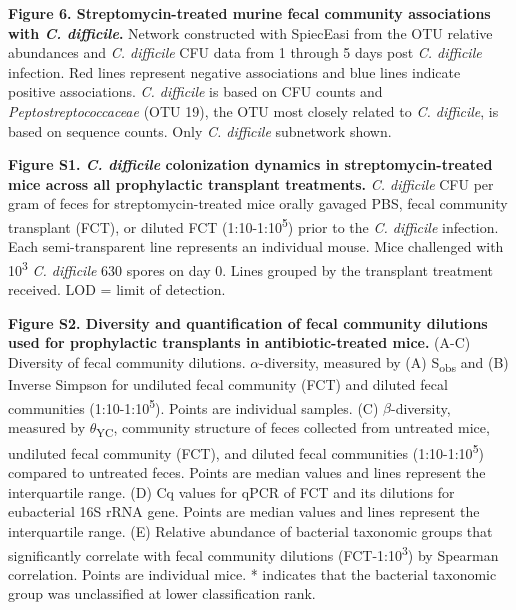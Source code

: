 \documentclass[
  12pt,
]{article}
\begin{document}
\hfill\break

\textbf{Figure 6. Streptomycin-treated murine fecal community
associations with \emph{C. difficile}.} Network constructed with
SpiecEasi from the OTU relative abundances and \emph{C. difficile} CFU
data from 1 through 5 days post \emph{C. difficile} infection. Red lines
represent negative associations and blue lines indicate positive
associations. \emph{C. difficile} is based on CFU counts and
\emph{Peptostreptococcaceae} (OTU 19), the OTU most closely related to
\emph{C. difficile}, is based on sequence counts. Only \emph{C.
difficile} subnetwork shown.

\hfill\break

\textbf{Figure S1. \emph{C. difficile} colonization dynamics in
streptomycin-treated mice across all prophylactic transplant
treatments.} \emph{C. difficile} CFU per gram of feces for
streptomycin-treated mice orally gavaged PBS, fecal community transplant
(FCT), or diluted FCT (1:10-1:10\textsuperscript{5}) prior to the
\emph{C. difficile} infection. Each semi-transparent line represents an
individual mouse. Mice challenged with 10\textsuperscript{3} \emph{C.
difficile} 630 spores on day 0. Lines grouped by the transplant
treatment received. LOD = limit of detection.

\hfill\break

\textbf{Figure S2. Diversity and quantification of fecal community
dilutions used for prophylactic transplants in antibiotic-treated mice.}
(A-C) Diversity of fecal community dilutions. \(\alpha\)-diversity,
measured by (A) S\textsubscript{obs} and (B) Inverse Simpson for
undiluted fecal community (FCT) and diluted fecal communities
(1:10-1:10\textsuperscript{5}). Points are individual samples. (C)
\(\beta\)-diversity, measured by \(\theta\)\textsubscript{YC}, community
structure of feces collected from untreated mice, undiluted fecal
community (FCT), and diluted fecal communities
(1:10-1:10\textsuperscript{5}) compared to untreated feces. Points are
median values and lines represent the interquartile range. (D) Cq values
for qPCR of FCT and its dilutions for eubacterial 16S rRNA gene. Points
are median values and lines represent the interquartile range. (E)
Relative abundance of bacterial taxonomic groups that significantly
correlate with fecal community dilutions (FCT-1:10\textsuperscript{3})
by Spearman correlation. Points are individual mice. * indicates that
the bacterial taxonomic group was unclassified at lower classification
rank.

\hfill\break
\end{document}
